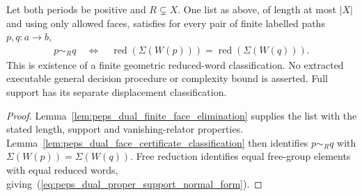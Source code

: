 \begin{lemma}
    \label{lem:peps_dual_proper_support_normal_form}
    \leanok
    Let both periods be positive and $R\subsetneq X$. One list as above,
    of length at most $|X|$ and using only allowed faces, satisfies for every
    pair of finite labelled paths $p,q:a\to b$,
    \begin{align}
        p\sim_Rq
        \quad\Longleftrightarrow\quad
        \operatorname{red}(\Sigma(W(p)))
        =\operatorname{red}(\Sigma(W(q))).
        \label{eq:peps_dual_proper_support_normal_form}
    \end{align}
    This is existence of a finite geometric reduced-word classification.
    No extracted executable general decision procedure or complexity bound
    is asserted. Full support has its separate displacement classification.
\end{lemma}
\begin{proof}\leanok
    Lemma~\ref{lem:peps_dual_finite_face_elimination} supplies the list with
    the stated length, support and vanishing-relator properties.
    Lemma~\ref{lem:peps_dual_face_certificate_classification} then identifies
    $p\sim_Rq$ with $\Sigma(W(p))=\Sigma(W(q))$.
    Free reduction identifies equal free-group elements with equal reduced
    words, giving~(\ref{eq:peps_dual_proper_support_normal_form}).
\end{proof}


